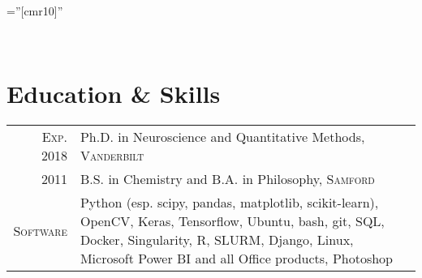 \documentclass[a4paper,11pt]{article}
\begin{document}
\pagestyle{empty} %

\font\fb=''[cmr10]'' %

\par{
 \\ \medskip
}


\section{Education \& Skills}
\begin{tabular}{rp{11cm}}	

    \textsc{Exp.} 2018 & Ph.D. in Neuroscience and Quantitative Methods, \textsc{Vanderbilt} \smallskip \\
    
    2011 & B.S. in Chemistry and B.A. in Philosophy, \textsc{Samford} \smallskip \\

    \textsc{Software} & \small{Python (esp. scipy, pandas, matplotlib, scikit-learn), OpenCV, Keras, Tensorflow, Ubuntu, bash, git, SQL, Docker, Singularity, R, SLURM, Django, Linux, Microsoft Power BI and all Office products, Photoshop} \\


\end{tabular}
\end{document}
